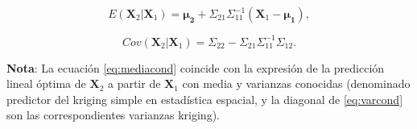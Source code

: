 \documentclass[
  10pt,
]{book}
\renewcommand{\boldsymbol}[1]{\symbf{#1}}
\renewcommand{\mathbf}[1]{\symbf{#1}}
\theoremstyle{break}
\theoremstyle{nonumberplain}
\begin{document}
\begin{equation}
E \left( \mathbf{X}_2 | \mathbf{X}_1 \right) = \boldsymbol{\mu_2} + \Sigma_{21} \Sigma_{11}^{-1}
\left(  \mathbf{X}_1 - \boldsymbol{\mu_1} \right), 
\label{eq:mediacond}
\end{equation}

\begin{equation}
Cov \left( \mathbf{X}_2 | \mathbf{X}_1 \right) =
\Sigma_{22} - \Sigma_{21} \Sigma_{11}^{-1} \Sigma_{12}.
\label{eq:varcond}
\end{equation}

\textbf{Nota}: La ecuación \eqref{eq:mediacond} coincide con la expresión de la predicción lineal óptima de \(\mathbf{X}_2\)
a partir de \(\mathbf{X}_1\) con media y varianzas conocidas (denominado predictor del kriging simple en estadística espacial, y la diagonal de \eqref{eq:varcond} son las correspondientes varianzas kriging).
\end{document}
